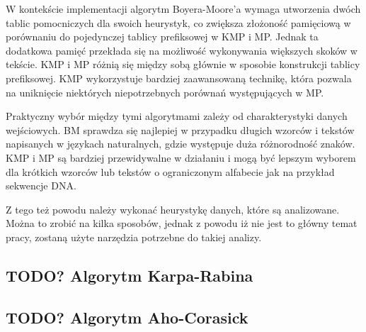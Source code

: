 W kontekście implementacji algorytm Boyera-Moore'a wymaga utworzenia dwóch tablic pomocniczych dla
swoich heurystyk, co zwiększa złożoność pamięciową w porównaniu do pojedynczej 
tablicy prefiksowej w KMP i MP. Jednak ta dodatkowa pamięć przekłada się na 
możliwość wykonywania większych skoków w tekście. KMP i MP różnią się między 
sobą głównie w sposobie konstrukcji tablicy prefiksowej. KMP wykorzystuje 
bardziej zaawansowaną technikę, która pozwala na uniknięcie niektórych 
niepotrzebnych porównań występujących w MP.

Praktyczny wybór między tymi algorytmami zależy od charakterystyki danych
wejściowych. BM sprawdza się najlepiej w przypadku długich wzorców i tekstów
napisanych w językach naturalnych, gdzie występuje duża różnorodność znaków.
KMP i MP są bardziej przewidywalne w działaniu i mogą być lepszym wyborem dla 
krótkich wzorców lub tekstów o ograniczonym alfabecie jak na przykład sekwencje
DNA.

Z tego też powodu należy wykonać heurystykę danych, które są analizowane.
Można to zrobić na kilka sposobów, jednak z powodu iż nie jest to główny temat
pracy, zostaną użyte narzędzia potrzebne do takiej analizy.


\subsection{TODO? Algorytm Karpa-Rabina}
\subsection{TODO? Algorytm Aho-Corasick}